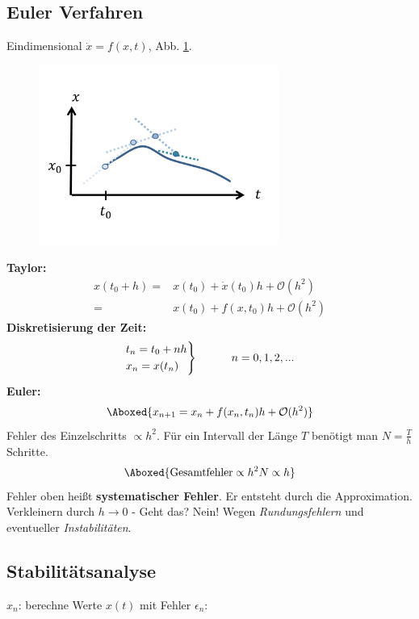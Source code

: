 \documentclass[12pt]{article}
\begin{document}
\subsection{Euler Verfahren}
Eindimensional $\dot{x}= f(x,t)$, Abb. \ref{fig:Euler}.\\  

\begin{figure}[ht]
\centering
\includegraphics[width=0.7\textwidth]{Folie57.png}
	\caption{}
	\label{fig:Euler}
\end{figure}
 
\textbf{Taylor:}
\begin{align}
x(t_0 +h)=& x(t_0) + \dot{x}(t_0)h+ \mathcal{O} (h^2) \\
=& x(t_0) + f(x,t_0) h+ \mathcal{O} (h^2)
\end{align}
\textbf{Diskretisierung der Zeit:}
\begin{align*}
\begin{rcases}
t_n = t_0 + nh \\ 
x_n = x(t_n)
\end{rcases}
\quad \quad \quad n=0,1,2,...
\end{align*}
\textbf{Euler:}
\begin{align}
\Aboxed{ x_{n+1}= x_n + f(x_n, t_n)h+ \mathcal{O}(h^2)}
\end{align}
Fehler des Einzelschritts $\propto h^2$. Für ein Intervall der Länge $T$ benötigt man $N= \frac{T}{h}$ Schritte.
\begin{align}
\Aboxed{ \mbox{Gesamtfehler} \propto h^2 N \propto h }
\end{align}
Fehler oben heißt \textbf{systematischer Fehler}. Er entsteht durch die Approximation. Verkleinern durch $h \to 0$ - Geht das? Nein! Wegen \textit{Rundungsfehlern} und eventueller \textit{Instabilitäten}.


\subsection{Stabilitätsanalyse}
$x_n$: berechne Werte $x(t)$ mit Fehler $\epsilon_n$:
\end{document}
